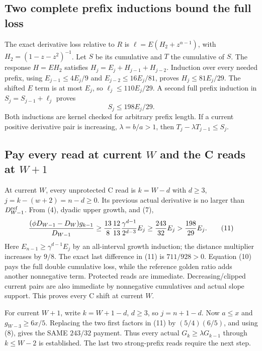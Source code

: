 \subsection*{Two complete prefix inductions bound the full loss}
The exact derivative loss relative to $R$ is
$\ell=E(H_2+z^{\alpha-1})$, with $H_2=(1-z-z^2)^{-1}$.
Let $S$ be its cumulative and $T$ the cumulative of $S$.
The response $H=EH_2$ satisfies
$H_j=E_j+H_{j-1}+H_{j-2}$.
Induction over every needed prefix, using $E_{j-1}\le4E_j/9$ and
$E_{j-2}\le16E_j/81$, proves $H_j\le81E_j/29$.
The shifted $E$ term is at most $E_j$, so $\ell_j\le110E_j/29$.
A second full prefix induction in $S_j=S_{j-1}+\ell_j$ proves
\[
                            S_j\le198E_j/29.        \tag{10}
\]
Both inductions are kernel checked for arbitrary prefix length. If a
current positive derivative pair is increasing, $\lambda=b/a>1$,
then $T_j-\lambda T_{j-1}\le S_j$.

\subsection*{Pay every read at current $W$ and the C reads at $W+1$}
At current $W$, every unprotected C read is $k=W-d$ with $d\ge3$,
$j=k-(w+2)=n-d\ge0$. Its previous actual derivative is no larger
than $D^{\rm ref}_{W-1}$. From (4), dyadic upper growth, and (7),
\[
 { (\phi D_{W-1}-D_W)g_{k-1}\over D_{W-1}}
 \ge {13\over8}{12\over13}
       {\gamma^{d-1}\over2^{d-3}}E_j
 \ge {243\over32}E_j>{198\over29}E_j.                \tag{11}
\]
Here $E_{n-1}\ge\gamma^{d-1}E_j$ by an all-interval growth induction;
the distance multiplier increases by $9/8$. The exact last difference
in (11) is $711/928>0$. Equation (10) pays the full double cumulative
loss, while the reference golden ratio adds another nonnegative term.
Protected reads are immediate. Decreasing/clipped current pairs are
also immediate by nonnegative cumulatives and actual slope support.
This proves every C shift at current $W$.

For current $W+1$, write $k=W+1-d$, $d\ge3$, so $j=n+1-d$.
Now $a\le x$ and $g_{W-3}\ge6x/5$. Replacing the two first factors
in (11) by $(5/4)(6/5)$, and using (8), gives the SAME $243/32$
payment. Thus every actual $G_k\ge\lambda G_{k-1}$ through $k\le W-2$
is established. The last two strong-prefix reads require the next step.

